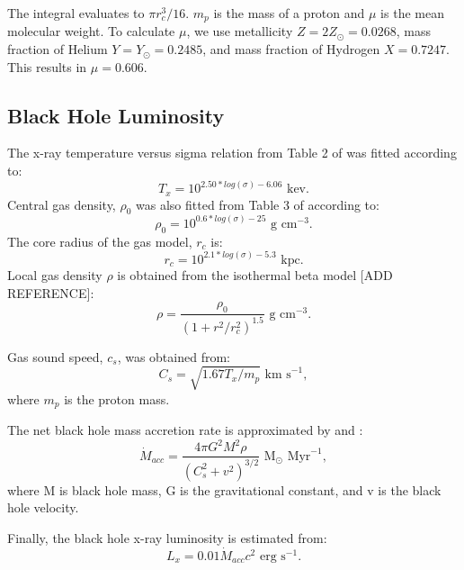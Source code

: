 \documentclass[english, apj]{emulateapj}
\begin{document}
The integral evaluates to ${\pi}r_c^3/16$.  $m_p$ is the mass of a proton and $\mu$ is the mean molecular weight.  To calculate $\mu$, we use metallicity $Z=2Z_{\odot}=0.0268$, mass fraction of Helium $Y=Y_{\odot}=0.2485$, and mass fraction of Hydrogen $X=0.7247$.  This results in $\mu=0.606$.

\subsection{Black Hole Luminosity}
The x-ray temperature versus sigma relation from Table 2 of  \citet{2018ApJ...857...32B} was fitted according to:
\begin{equation}
    T_x = 10^{2.50*log(\sigma) - 6.06} \text{  kev}.
\end{equation}
Central gas density, ${\rho}_0$ was also fitted from Table 3 of \citet{2018ApJ...857...32B} according to:
\begin{equation}
    \rho_0 = 10^{0.6*log(\sigma) - 25} \text{  g cm}^{-3}.
\end{equation}
The core radius of the gas model, ${r_c}$ is:
\begin{equation}
    r_c = 10^{2.1*log(\sigma) - 5.3} \text{  kpc}.
\end{equation}
Local gas density ${\rho}$ is obtained from the isothermal beta model [ADD REFERENCE]:
\begin{equation} \label{beta_model}
    \rho = \frac{\rho_0}{(1+r^2/r_c^2)^{1.5}} \text{  g cm}^{-3}.
\end{equation}

Gas sound speed, $c_s$, was obtained from:
\begin{equation}
    C_s = \sqrt{1.67T_x/m_p} \text{  km s}^{-1},
\end{equation}
where $m_p$ is the proton mass.

The net black hole mass accretion rate is approximated by \citet{2018MNRAS.476.1412I} and \citet{2019arXiv190202349I}:
\begin{equation}
    \dot{M}_{acc} = \frac{4{\pi}G^2M^2\rho}{(C_s^2+v^2)^{3/2}} \text{  M}_\odot \text{ Myr}^{-1},
\end{equation}
where M is black hole mass, G is the gravitational constant, and v is the black hole velocity.

Finally, the black hole x-ray luminosity is estimated from:
\begin{equation}
    L_x = 0.01\dot{M}_{acc}c^2 \text{  erg s}^{-1}.
\end{equation}
\end{document}
